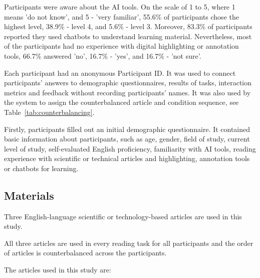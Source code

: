 \documentclass{IEEEtran}
\begin{document}
Participants were aware about the AI tools. On the scale of 1 to 5, where 1 means 'do not know', and 5 - 'very familiar', 55.6\% of participants chose the highest level, 38.9\% - level 4, and 5.6\% - level 3. Moreover, 83.3\% of participants reported they used chatbots to understand learning material. Nevertheless, most of the participants had no experience with digital highlighting or annotation tools, 66.7\% answered 'no', 16.7\% - 'yes', and 16.7\% - 'not sure'.

Each participant had an anonymous Participant ID. It was used to connect participants' answers to demographic questionnaires, results of tasks, interaction metrics and feedback without recording participants' names. It was also used by the system to assign the counterbalanced article and condition sequence, see Table~\ref{tab:counterbalancing}.

Firstly, participants filled out an initial demographic questionnaire. It contained basic information about participants, such as age, gender, field of study, current level of study, self-evaluated English proficiency, familiarity with AI tools, reading experience with scientific or technical articles and highlighting, annotation tools or chatbots for learning.

\subsection{Materials}

Three English-language scientific or technology-based articles are used in this study.

All three articles are used in every reading task for all participants and the order of articles is counterbalanced across the participants.

The articles used in this study are:
\end{document}
